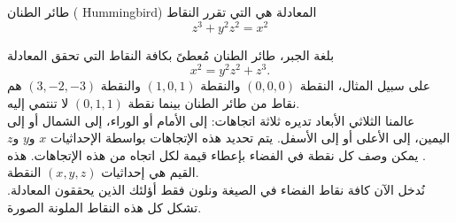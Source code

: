 \begin{surferPage}{طائر الطنان ( Hummingbird)}
المعادلة هي التي تقرر النقاط\\
  
  \smallskip
\[z^3+ y^2	z^2	= x^2\]

\singlespacing
بلغة الجبر، طائر الطنان مُعطىً بكافة النقاط التي تحقق المعادلة
\smallskip
\[ x^2= y^2z^2+z^3.\]
\smallskip
على سبيل المثال، النقطة $(0,0,0)$ والنقطة  $(1,0,1)$ والنقطة $(3,-2,-3)$ هم نقاط من طائر الطنان بينما نقطة $(0,1,1)$ لا تنتمي إليه.\\
 \singlespacing
عالمنا الثلاثي الأبعاد تديره ثلاثة اتجاهات: إلى الأمام أو الوراء، إلى الشمال أو إلى اليمين، إلى الأعلى أو إلى الأسفل. يتم تحديد هذه الإتجاهات بواسطة الإحداثيات $x$ و$y$ و$z$. يمكن وصف كل نقطة في الفضاء بإعطاء قيمة لكل اتجاه من هذه الإتجاهات. هذه القيم هي إحداثيات $(x,y,z)$ النقطة.\\
\singlespacing
نُدخل الآن كافة نقاط الفضاء في الصيغة ونلون فقط أؤلئك الذين يحققون المعادلة. تشكل كل هذه النقاط الملونة الصورة.
\end{surferPage}